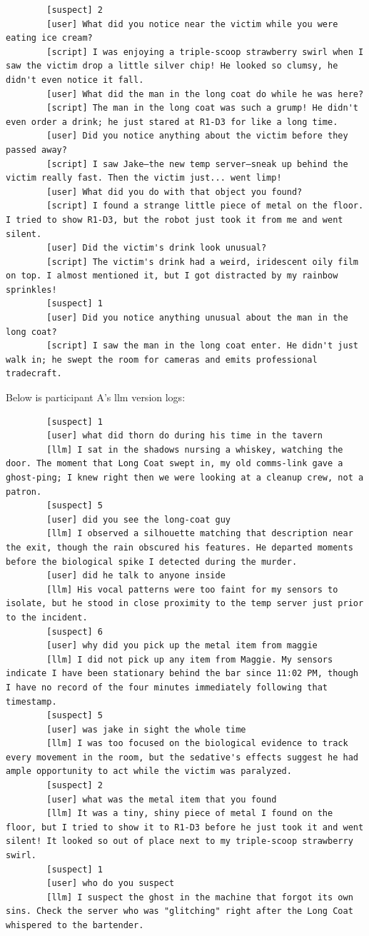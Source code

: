 \documentclass[12pt, a4paper]{report}
\begin{document}
\begin{verbatim}
		[suspect] 2
		[user] What did you notice near the victim while you were eating ice cream?
		[script] I was enjoying a triple-scoop strawberry swirl when I saw the victim drop a little silver chip! He looked so clumsy, he didn't even notice it fall.
		[user] What did the man in the long coat do while he was here?
		[script] The man in the long coat was such a grump! He didn't even order a drink; he just stared at R1-D3 for like a long time.
		[user] Did you notice anything about the victim before they passed away?
		[script] I saw Jake—the new temp server—sneak up behind the victim really fast. Then the victim just... went limp!
		[user] What did you do with that object you found?
		[script] I found a strange little piece of metal on the floor. I tried to show R1-D3, but the robot just took it from me and went silent.
		[user] Did the victim's drink look unusual?
		[script] The victim's drink had a weird, iridescent oily film on top. I almost mentioned it, but I got distracted by my rainbow sprinkles!
		[suspect] 1
		[user] Did you notice anything unusual about the man in the long coat?
		[script] I saw the man in the long coat enter. He didn't just walk in; he swept the room for cameras and emits professional tradecraft.
	\end{verbatim}
	
	Below is participant A's \gls{llm} version logs:
	
	\begin{verbatim}
		[suspect] 1
		[user] what did thorn do during his time in the tavern
		[llm] I sat in the shadows nursing a whiskey, watching the door. The moment that Long Coat swept in, my old comms-link gave a ghost-ping; I knew right then we were looking at a cleanup crew, not a patron.
		[suspect] 5
		[user] did you see the long-coat guy
		[llm] I observed a silhouette matching that description near the exit, though the rain obscured his features. He departed moments before the biological spike I detected during the murder.
		[user] did he talk to anyone inside
		[llm] His vocal patterns were too faint for my sensors to isolate, but he stood in close proximity to the temp server just prior to the incident.
		[suspect] 6
		[user] why did you pick up the metal item from maggie
		[llm] I did not pick up any item from Maggie. My sensors indicate I have been stationary behind the bar since 11:02 PM, though I have no record of the four minutes immediately following that timestamp.
		[suspect] 5
		[user] was jake in sight the whole time
		[llm] I was too focused on the biological evidence to track every movement in the room, but the sedative's effects suggest he had ample opportunity to act while the victim was paralyzed.
		[suspect] 2
		[user] what was the metal item that you found
		[llm] It was a tiny, shiny piece of metal I found on the floor, but I tried to show it to R1-D3 before he just took it and went silent! It looked so out of place next to my triple-scoop strawberry swirl.
		[suspect] 1
		[user] who do you suspect
		[llm] I suspect the ghost in the machine that forgot its own sins. Check the server who was "glitching" right after the Long Coat whispered to the bartender.
	\end{verbatim}
	
\end{document}
